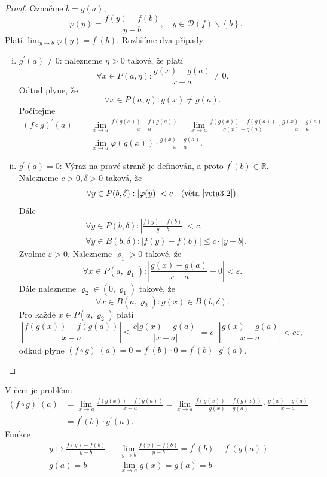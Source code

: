 \begin{proof}
	Označme $b=g(a)$,
	$$
	\varphi(y)=\frac{f(y)-f(b)}{y-b}, \quad y\in\mathcal D(f)\smallsetminus \left \{ b \right \} .
	$$
	Platí $\lim_{y\to b} \varphi(y)=f^\prime(b)$. Rozlišíme dva případy
	\begin{enumerate}[(i)]
		\item $g^\prime (a) \ne 0$: nalezneme $\eta > 0$ takové, že platí
		$$
		    \forall x \in P(a,\eta):\frac{g(x)-g(a)}{x-a} \ne 0.
		$$
		Odtud plyne, že
		$$
		    \forall x \in P(a, \eta): g(x)\ne g(a).
		$$
		Počítejme
		\begin{align*}
			(f\circ g)^\prime (a) &= \lim_{x\to a} \frac{f(g(x))-f(g(a))}{x-a}=\lim_{x\to a} \frac{f(g(x))-f(g(a))}{g(x)-g(a)}\cdot \frac{g(x)-g(a)}{x-a}\\
			&=\lim_{x\to a} \varphi(g(x))\cdot \frac{g(x)-g(a)}{x-a}.
		\end{align*}
		\item $g^\prime(a) = 0$: Výraz na pravé straně je definován, a proto
		$f^\prime(b)\in \mathbb R $. Nalezneme $c>0, \delta>0$ taková, že
		$$
		    \forall y \in P(b,\delta): |\varphi(y)|<c \quad (\textrm{věta }\ref{veta3.2}).
		$$
		Dále
		\begin{align*}
			& \forall y \in P(b,\delta): \left | \frac{f(y)-f(b)}{y-b} \right |<c,\\
			& \forall y \in B(b,\delta): |f(y)-f(b)| \leq c\cdot |y-b|.
\end{align*}
    Zvolme $\varepsilon>0$. Nalezneme $\varrho_1>0$ takové, že
    $$
        \forall x \in P(a,\varrho_1): \left | \frac{g(x)-g(a)}{x-a}-0 \right|<\varepsilon.
    $$
    Dále nalezneme $\varrho_2 \in (0,\varrho_1)$ takové, že
    $$
        \forall x \in B(a,\varrho_2): g(x)\in B(b,\delta).
    $$
    Pro každé $x \in P(a,\varrho_2)$ platí
    $$
	\left | \frac{f(g(x))-f(g(a))}{x-a} \right | \leq \frac{c|g(x)-g(a)|}{|x-a|} = c\cdot \left | \frac{g(x)-g(a)}{x-a} \right |<c\varepsilon,
    $$
    odkud plyne $(f\circ g)^\prime(a)=0=f^\prime(b)\cdot 0 = f^\prime(b)\cdot g^\prime(a)$.\qedhere
\end{enumerate}
\end{proof}

\begin{poznamka}
	V čem je problém:
	\begin{align*}
    (f\circ g)^\prime (a) &= \lim_{x\to a} \frac{f(g(x))-f(g(a))}{x-a} = \lim_{x\to a} \frac{f(g(x))-f(g(a))}{g(x)-g(a)}\cdot \frac{g(x)-g(a)}{x-a}\\
    &= f^\prime(b)\cdot g^\prime(a).
    \end{align*}
    Funkce
    \begin{align*}
	&y\mapsto \frac{f(y)-f(b)}{y-b} && \lim_{y\to b} \frac{f(y)-f(b)}{y-b}=f^\prime(b)-f^\prime(g(a))\\
	&g(a)=b && \lim_{x\to a} g(x) = g(a)=b
    \end{align*}
\end{poznamka}


